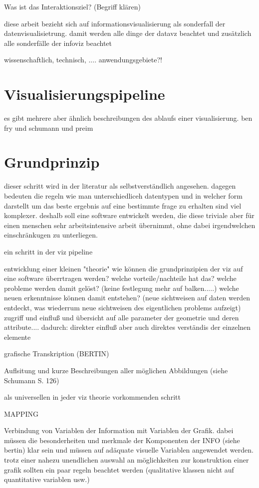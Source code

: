 \documentclass[a4paper, 12pt, onepage, pdftex, headsepline, footsepline]{scrreprt}
\begin{document}
Was ist das Interaktionsziel? (Begriff klären)

diese arbeit bezieht sich auf informationsvisualisierung als sonderfall der datenvisualisietrung. damit werden alle dinge der datavz beachtet und zusätzlich alle sonderfälle der infoviz beachtet

wissenschaftlich, technisch, .... anwendungsgebiete?!
\section{Visualisierungspipeline}
es gibt mehrere aber ähnlich beschreibungen des ablaufs einer visualisierung.
ben fry und schumann  und preim
\section{Grundprinzip}
dieser schritt wird in der literatur als selbstverständlich angesehen. dagegen bedeuten die regeln wie man unterschiedliceh datentypen und in welcher form darstellt um das beste ergebnis auf eine bestimmte frage zu erhalten sind viel komplexer.
deshalb soll eine software entwickelt werden, die diese triviale aber für einen menschen sehr arbeitsintensive arbeit übernimmt, ohne dabei irgendwelchen einschränkugen zu unterliegen.

ein schritt in der viz pipeline

entwicklung einer kleinen "theorie"
wie können die grundprinzipien der viz auf eine software überrtragen werden?
welche vorteile/nachteile hat das?
welche probleme werden damit gelöst? (keine festlegung mehr auf balken.....)
welche neuen erkenntnisse können damit entstehen? (neue sichtweisen auf daten werden entdeckt, was wiederrum neue sichtweisen des eigentlichen problems aufzeigt)
zugriff und einfluß und übersicht auf alle parameter der geometrie und deren attribute....
dadurch: direkter einfluß aber auch direktes verständis der einzelnen elemente

grafische Transkription (BERTIN)

Auflsitung und kurze Beschreibungen aller möglichen Abbildungen (siehe Schumann S. 126)

als universellen in jeder viz theorie vorkommenden schritt

MAPPING

Verbindung von Variablen der Information mit Variablen der Grafik.
dabei müssen die besonderheiten und merkmale der Komponenten der INFO (siehe bertin) klar sein und müssen auf adäquate visuelle Variablen angewendet werden.
trotz einer nahezu unendlichen auswahl an möglichkeiten zur konstruktion einer grafik sollten ein paar regeln beachtet werden (qualitative klassen nicht auf quantitative variablen usw.)
\end{document}
